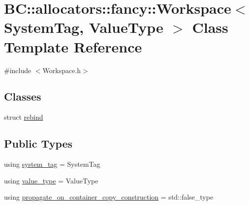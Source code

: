\hypertarget{classBC_1_1allocators_1_1fancy_1_1Workspace}{}\section{BC\+:\+:allocators\+:\+:fancy\+:\+:Workspace$<$ System\+Tag, Value\+Type $>$ Class Template Reference}
\label{classBC_1_1allocators_1_1fancy_1_1Workspace}


{\ttfamily \#include $<$Workspace.\+h$>$}

\subsection*{Classes}
\begin{DoxyCompactItemize}
\item 
struct \hyperlink{structBC_1_1allocators_1_1fancy_1_1Workspace_1_1rebind}{rebind}
\end{DoxyCompactItemize}
\subsection*{Public Types}
\begin{DoxyCompactItemize}
\item 
using \hyperlink{classBC_1_1allocators_1_1fancy_1_1Workspace_a55a7cc23b201c017e708a7f9e06ecaa7}{system\+\_\+tag} = System\+Tag
\item 
using \hyperlink{classBC_1_1allocators_1_1fancy_1_1Workspace_a26bd8146719faae12effecc398b0deca}{value\+\_\+type} = Value\+Type
\item 
using \hyperlink{classBC_1_1allocators_1_1fancy_1_1Workspace_a035ffccb59a4b0b777d979e4a5afb69b}{propagate\+\_\+on\+\_\+container\+\_\+copy\+\_\+construction} = std\+::false\+\_\+type
\end{DoxyCompactItemize}
